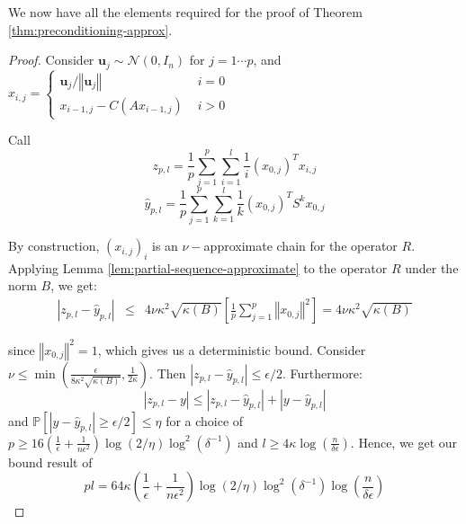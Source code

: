 We now have all the elements required for the proof of Theorem \ref{thm:preconditioning-approx}.

\begin{proof}

Consider $\mathbf{u}_{j}\sim\mathcal{N}\left(0,I_{n}\right)$ for
$j=1\cdots p$, and $x_{i,j}=\begin{cases}
\mathbf{u}_{j}/\left\Vert \mathbf{u}_{j}\right\Vert  & \,\, i=0\\
x_{i-1,j}-C\left(Ax_{i-1,j}\right) & \,\, i>0
\end{cases}$

Call 
\[
z_{p,l}=\frac{1}{p}\sum_{j=1}^{p}\sum_{i=1}^{l}\frac{1}{i}\left(x_{0,j}\right)^{T}x_{i,j}
\]
\[
\hat{y}_{p,l}=\frac{1}{p}\sum_{j=1}^{p}\sum_{k=1}^{l}\frac{1}{k}\left(x_{0,j}\right)^{T}S^{k}x_{0,j}
\]


By construction, $\left(x_{i,j}\right)_{i}$ is an $\nu-$approximate
chain for the operator $R$. Applying Lemma \ref{lem:partial-sequence-approximate}
to the operator $R$ under the norm $B$, we get:
\begin{eqnarray*}
\left|z_{p,l}-\hat{y}_{p,l}\right| & \leq & 4\nu\kappa^{2}\sqrt{\kappa\left(B\right)}\left[\frac{1}{p}\sum_{j=1}^{p}\left\Vert x_{0,j}\right\Vert ^{2}\right]=4\nu\kappa^{2}\sqrt{\kappa\left(B\right)}
\end{eqnarray*}


since $\left\Vert x_{0,j}\right\Vert ^{2}=1$, which gives us a deterministic
bound. Consider $\nu\leq\min\left(\frac{\epsilon}{8\kappa^{2}\sqrt{\kappa\left(B\right)}},\frac{1}{2\kappa}\right)$.
Then $\left|z_{p,l}-\hat{y}_{p,l}\right|\leq\epsilon/2$. Furthermore:
\[
\left|z_{p,l}-y\right|\leq\left|z_{p,l}-\hat{y}_{p,l}\right|+\left|y-\hat{y}_{p,l}\right|
\]
and $\mathbb{P}\left[\left|y-\hat{y}_{p,l}\right|\geq\epsilon/2\right]\leq\eta$
for a choice of $p\geq16\left(\frac{1}{\epsilon}+\frac{1}{n\epsilon^{2}}\right)\log\left(2/\eta\right)\log^{2}\left(\delta^{-1}\right)$
and $l\geq4\kappa\log\left(\frac{n}{\delta\epsilon}\right)$. Hence,
we get our bound result of 
\[
pl=64\kappa\left(\frac{1}{\epsilon}+\frac{1}{n\epsilon^{2}}\right)\log\left(2/\eta\right)\log^{2}\left(\delta^{-1}\right)\log\left(\frac{n}{\delta\epsilon}\right)
\]


\end{proof}
